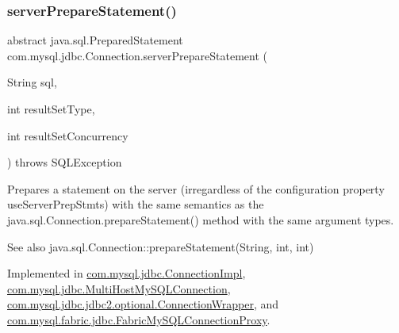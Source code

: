 \subsubsection{\texorpdfstring{server\+Prepare\+Statement()}{serverPrepareStatement()}\hspace{0.1cm}{\footnotesize\ttfamily [3/6]}}
{\footnotesize\ttfamily abstract java.\+sql.\+Prepared\+Statement com.\+mysql.\+jdbc.\+Connection.\+server\+Prepare\+Statement (\begin{DoxyParamCaption}\item[{String}]{sql,  }\item[{int}]{result\+Set\+Type,  }\item[{int}]{result\+Set\+Concurrency }\end{DoxyParamCaption}) throws S\+Q\+L\+Exception\hspace{0.3cm}{\ttfamily [abstract]}}

Prepares a statement on the server (irregardless of the configuration property \textquotesingle{}use\+Server\+Prep\+Stmts\textquotesingle{}) with the same semantics as the java.\+sql.\+Connection.\+prepare\+Statement() method with the same argument types.

\begin{DoxySeeAlso}{See also}
java.\+sql.\+Connection\+::prepare\+Statement(\+String, int, int) 
\end{DoxySeeAlso}


Implemented in \mbox{\hyperlink{classcom_1_1mysql_1_1jdbc_1_1_connection_impl_af4efc83e3fa843f0acaa4bc786d42237}{com.\+mysql.\+jdbc.\+Connection\+Impl}}, \mbox{\hyperlink{classcom_1_1mysql_1_1jdbc_1_1_multi_host_my_s_q_l_connection_a6327530074443cc7c221a1323f871b65}{com.\+mysql.\+jdbc.\+Multi\+Host\+My\+S\+Q\+L\+Connection}}, \mbox{\hyperlink{classcom_1_1mysql_1_1jdbc_1_1jdbc2_1_1optional_1_1_connection_wrapper_a46f978f9cb59c27e48921735fd605245}{com.\+mysql.\+jdbc.\+jdbc2.\+optional.\+Connection\+Wrapper}}, and \mbox{\hyperlink{classcom_1_1mysql_1_1fabric_1_1jdbc_1_1_fabric_my_s_q_l_connection_proxy_a10da05d178dc0a7d035a65c68996c48c}{com.\+mysql.\+fabric.\+jdbc.\+Fabric\+My\+S\+Q\+L\+Connection\+Proxy}}.

\mbox{\label{interfacecom_1_1mysql_1_1jdbc_1_1_connection_aa815a139c20cb2ecb32bc50fca219c6e}} 
